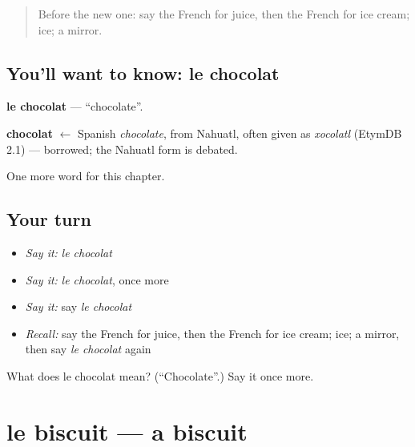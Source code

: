 \label{lesson:FR-C121-chocolat}



\begin{quote}
Before the new one: say the French for juice, then the French for ice cream; ice; a mirror.
\end{quote}

\subsection*{You'll want to know: le chocolat}
\textbf{le chocolat} — \textquotedblleft{}chocolate\textquotedblright{}.

\begin{cousinweb}
\textbf{chocolat} $\leftarrow$ Spanish \emph{chocolate}, from Nahuatl, often given as \emph{xocolatl} (EtymDB 2.1) — borrowed; the Nahuatl form is debated.
\end{cousinweb}

\begin{grammarlens}[title={What you've built}]
One more word for this chapter.
\end{grammarlens}

\subsection*{Your turn}
\begin{itemize}
\raggedright
  \item \emph{Say it:} \emph{le chocolat}
  \item \emph{Say it:} \emph{le chocolat}, once more
  \item \emph{Say it:} say \emph{le chocolat}
  \item \emph{Recall:} say the French for juice, then the French for ice cream; ice; a mirror, then say \emph{le chocolat} again
\end{itemize}

\begin{tcolorbox}[breakable,colback=teal!4,colframe=teal!35!black,title={Before you move on}]
What does le chocolat mean? (\textquotedblleft{}Chocolate\textquotedblright{}.) Say it once more.
\end{tcolorbox}
\section[le biscuit]{le biscuit — a biscuit}

\label{lesson:FR-C121-biscuit}



